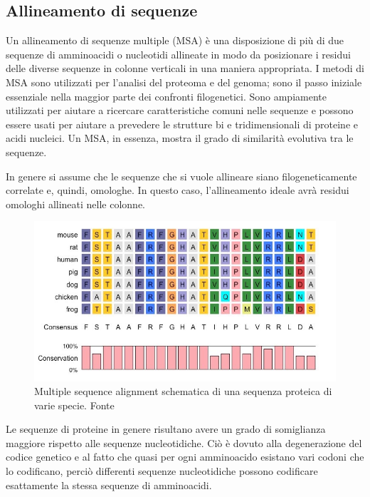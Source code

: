 \subsection{Allineamento di sequenze} \label{sec:MSA}
{
	Un allineamento di sequenze multiple (MSA) è una disposizione di più di due sequenze di amminoacidi o nucleotidi allineate in modo da posizionare i residui delle diverse sequenze in colonne verticali in una maniera appropriata. I metodi di MSA sono utilizzati per l'analisi del proteoma e del genoma; sono il passo iniziale essenziale nella maggior parte dei confronti filogenetici. Sono ampiamente utilizzati per aiutare a ricercare caratteristiche comuni nelle sequenze e possono essere usati per aiutare a prevedere le strutture bi e tridimensionali di proteine e acidi nucleici. Un MSA, in essenza, mostra il grado di similarità evolutiva tra le sequenze. 
	
	\par In genere si assume che le sequenze che si vuole allineare siano filogeneticamente correlate e, quindi, omologhe. In questo caso, l'allineamento ideale avrà residui omologhi allineati nelle colonne.
	
	\begin{figure}[!htb]
		\centering
		\includegraphics[scale=0.5]{images/msa.jpeg}
		\caption{Multiple sequence alignment schematica di una sequenza proteica di varie specie. Fonte\cite{msaBioNinja}}
		\label{fig:msa}
	\end{figure}
	
	\par Le sequenze di proteine in genere risultano avere un grado di somiglianza maggiore rispetto alle sequenze nucleotidiche. Ciò è dovuto alla degenerazione del codice genetico e al fatto che quasi per ogni amminoacido esistano vari codoni che lo codificano, perciò differenti sequenze nucleotidiche possono codificare esattamente la stessa sequenze di amminoacidi.
	
}

